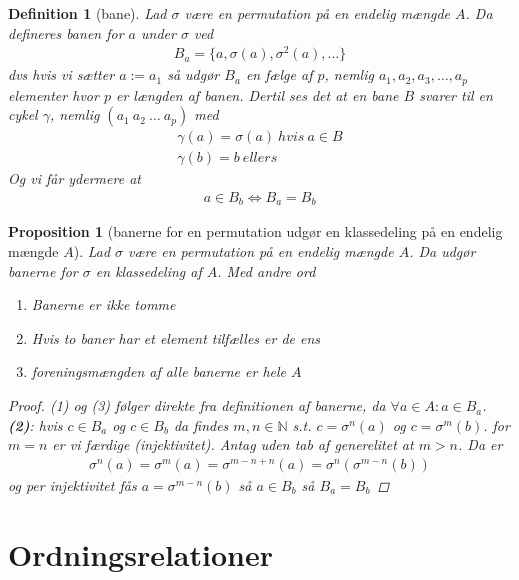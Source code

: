 \documentclass[10pt,twoside,openany,final]{memoir}
\theoremstyle{break}
\newtheorem{proposition}[section]{Proposition}
\newtheorem{definition}[section]{Definition}
\theoremstyle{Break}
\newcommand{\N}{\mathbb{N}}
\begin{document}
\begin{definition}[bane]
Lad $\sigma$ være en permutation på en endelig mængde $A$. Da defineres banen for $a$ under $\sigma$ ved
\begin{align*}
B_{a}=\{a,\sigma(a),\sigma^2(a),\dots \}
\end{align*}
dvs hvis vi sætter $a:=a_{1}$ så udgør $B_{a}$ en fælge af $p$, nemlig $a_{1},a_{2},a_{3},\dots,a_{p}$ elementer hvor $p$ er længden af banen. Dertil ses det at en bane $B$ svarer til en cykel $\gamma$, nemlig $(a_{1} \ a_{2} \ \dots \ a_{p})$ med
\begin{align*}
\gamma(a)=\sigma(a) \ hvis \ a \in B\\
\gamma(b) = b \ ellers
\end{align*}
Og vi får ydermere at 
\begin{align*}
a \in B_{b} \iff B_{a}=B_{b}
\end{align*}
\end{definition}

\begin{proposition}[banerne for en permutation udgør en klassedeling på en endelig mængde $A$]
Lad $\sigma$ være en permutation på en endelig mængde $A$. Da udgør banerne for $\sigma$ en klassedeling af $A$. Med andre ord
\begin{enumerate}
\item Banerne er ikke tomme
\item Hvis to baner har et element tilfælles er de ens
\item foreningsmængden af alle banerne er hele $A$
\end{enumerate}
\begin{proof}
(1) og (3) følger direkte fra definitionen af banerne, da $\forall a \in A \colon a \in B_{a}$. \textbf{(2)}: hvis $c \in B_{a}$ og $c \in B_{b}$ da findes $m, n \in \N$ s.t. $c=\sigma^n(a)$ og $c=\sigma^m(b)$. for $m=n$ er vi færdige (injektivitet). Antag uden tab af generelitet at $m > n$. Da er 
\begin{align*}
\sigma^n (a)=\sigma^m (a)=\sigma^{m-n+n}(a)=\sigma^n(\sigma^{m-n}(b))
\end{align*}
og per injektivitet fås $a=\sigma^{m-n}(b)$ så $a \in B_{b}$ så $B_{a}=B_{b}$
\end{proof}
\end{proposition}

\chapter{Ordningsrelationer}
\end{document}

